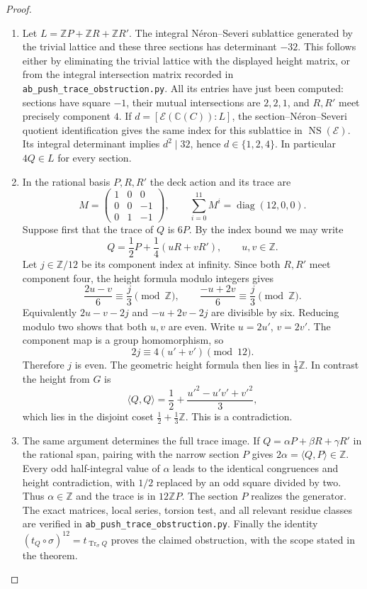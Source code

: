 \begin{proof}
\begin{enumerate}[label=\arabic*.,leftmargin=*]
\item Let $L=\mathbb ZP+\mathbb ZR+\mathbb ZR'$.
The integral N\'eron--Severi sublattice
generated by the trivial lattice and
these three sections has determinant
$-32$. This follows either by eliminating
the trivial lattice with the displayed
height matrix, or from the integral
intersection matrix recorded in
\texttt{ab\_push\_trace\_obstruction.py}.
All its entries have just been computed:
sections have square $-1$, their mutual
intersections are $2,2,1$, and $R,R'$
meet precisely component $4$.
If $d=[\mathscr E(\mathbb C(C)):L]$,
the section--N\'eron--Severi quotient
identification gives the same index
for this sublattice in
$\operatorname{NS}(\mathscr E)$.
Its integral determinant implies
$d^2\mid32$, hence $d\in\{1,2,4\}$.
In particular $4Q\in L$ for every section.

\item In the rational basis $P,R,R'$ the
deck action and its trace are
\[
 M=\begin{pmatrix}1&0&0\\0&0&-1\\0&1&-1\end{pmatrix},
 \qquad \sum_{i=0}^{11}M^i=
       \operatorname{diag}(12,0,0).
\]
Suppose first that the trace of $Q$ is
$6P$. By the index bound we may write
\[
 Q=\frac12P+\frac14(uR+vR'),\qquad u,v\in\mathbb Z.
\]
Let $j\in\mathbb Z/12$ be its component
index at infinity. Since both $R,R'$
meet component four, the height formula
modulo integers gives
\[
 \frac{2u-v}{6}\equiv\frac j3\pmod{\mathbb Z},
 \qquad
 \frac{-u+2v}{6}\equiv\frac j3\pmod{\mathbb Z}.
\]
Equivalently $2u-v-2j$ and $-u+2v-2j$
are divisible by six. Reducing modulo
two shows that both $u,v$ are even.
Write $u=2u'$, $v=2v'$. The component
map is a group homomorphism, so
\[
 2j\equiv4(u'+v')\pmod{12}.
\]
Therefore $j$ is even. The geometric
height formula then lies in
$\tfrac13\mathbb Z$. In contrast the
height from $G$ is
\[
 \langle Q,Q\rangle
 =\frac12+\frac{u'^2-u'v'+v'^2}{3},
\]
which lies in the disjoint coset
$\tfrac12+\tfrac13\mathbb Z$.
This is a contradiction.

\item The same argument determines the full
trace image. If $Q=\alpha P+\beta R+\gamma R'$
in the rational span, pairing with the
narrow section $P$ gives
$2\alpha=\langle Q,P\rangle\in\mathbb Z$.
Every odd half-integral value of $\alpha$
leads to the identical congruences and
height contradiction, with $1/2$
replaced by an odd square divided by
two. Thus $\alpha\in\mathbb Z$ and
the trace is in $12\mathbb ZP$.
The section $P$ realizes the generator.
The exact matrices, local series,
torsion test, and all relevant residue
classes are verified in
\texttt{ab\_push\_trace\_obstruction.py}.
Finally the identity
$(t_Q\circ\sigma)^{12}=t_{\operatorname{Tr}_\sigma Q}$
proves the claimed obstruction, with
the scope stated in the theorem.
\end{enumerate}
\end{proof}


